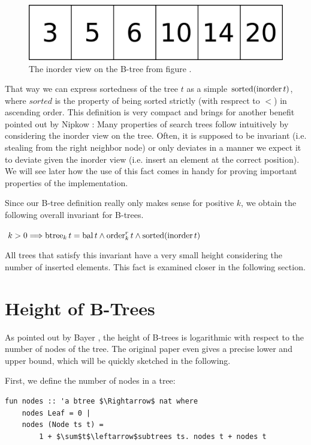 \begin{figure}
    \centering
    \includegraphics[width=0.3\linewidth]{figures/inorder-basic.pdf}
    \caption[Example inorder of a B-Tree]
    {The inorder view on the B-tree from figure .}
    \label{fig:inorder-basic}
\end{figure}

That way we can express sortedness of the tree $t$ as a simple $\operatorname{sorted} (\operatorname{inorder} t)$,
where $sorted$ is the property of being sorted strictly (with resprect to $<$)
in ascending order.
This definition is very compact and brings for another benefit
pointed out by Nipkow \parencite{DBLP:conf/itp/Nipkow16}:
Many properties of search trees follow intuitively by considering
the inorder view on the tree.
Often, it is supposed to be invariant (i.e. stealing from the right neighbor node)
or only deviates in a manner we expect it to deviate given the inorder view
(i.e. insert an element at the correct position).
We will see later how the use of this fact comes in handy for proving
important properties of the implementation.

Since our B-tree definition really only makes sense for positive $k$,
we obtain the following overall invariant for B-trees.

\begin{definition}
    \label{def:btree-def}
    $k > 0 \Longrightarrow \operatorname{btree}_k t = \operatorname{bal} t \wedge \operatorname{order}^r_k t \wedge \operatorname{sorted} (\operatorname{inorder} t)$
\end{definition}

All trees that satisfy this invariant have a very small
height considering the number of inserted elements.
This fact is examined closer in the following section.

\section{Height of B-Trees}

As pointed out by Bayer \parencite{DBLP:journals/acta/BayerM72},
the height of B-trees is logarithmic with respect to the number
of nodes of the tree.
The original paper even gives a precise lower and upper bound,
which will be quickly sketched in the following.

First, we define the number of nodes in a tree:
\begin{lstlisting}[mathescape=true, language=Isabelle]
fun nodes :: 'a btree $\Rightarrow$ nat where
    nodes Leaf = 0 |
    nodes (Node ts t) =
        1 + $\sum$t$\leftarrow$subtrees ts. nodes t + nodes t
\end{lstlisting}

